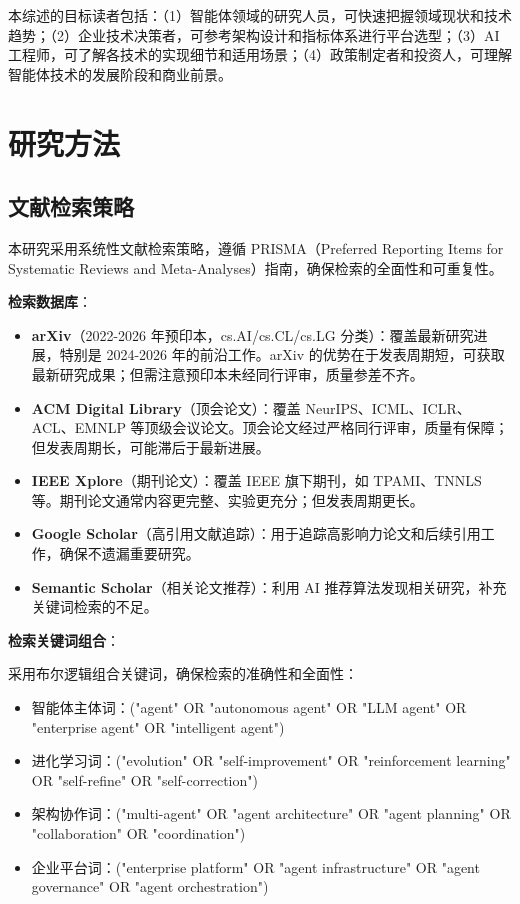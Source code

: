 \documentclass[12pt,a4paper]{article}
\begin{document}
本综述的目标读者包括：（1）智能体领域的研究人员，可快速把握领域现状和技术趋势；（2）企业技术决策者，可参考架构设计和指标体系进行平台选型；（3）AI 工程师，可了解各技术的实现细节和适用场景；（4）政策制定者和投资人，可理解智能体技术的发展阶段和商业前景。

\section{研究方法}
\label{sec:method}

\subsection{文献检索策略}

本研究采用系统性文献检索策略，遵循 PRISMA（Preferred Reporting Items for Systematic Reviews and Meta-Analyses）指南，确保检索的全面性和可重复性。

\textbf{检索数据库}：
\begin{itemize}
    \item \textbf{arXiv}（2022-2026 年预印本，cs.AI/cs.CL/cs.LG 分类）：覆盖最新研究进展，特别是 2024-2026 年的前沿工作。arXiv 的优势在于发表周期短，可获取最新研究成果；但需注意预印本未经同行评审，质量参差不齐。
    
    \item \textbf{ACM Digital Library}（顶会论文）：覆盖 NeurIPS、ICML、ICLR、ACL、EMNLP 等顶级会议论文。顶会论文经过严格同行评审，质量有保障；但发表周期长，可能滞后于最新进展。
    
    \item \textbf{IEEE Xplore}（期刊论文）：覆盖 IEEE 旗下期刊，如 TPAMI、TNNLS 等。期刊论文通常内容更完整、实验更充分；但发表周期更长。
    
    \item \textbf{Google Scholar}（高引用文献追踪）：用于追踪高影响力论文和后续引用工作，确保不遗漏重要研究。
    
    \item \textbf{Semantic Scholar}（相关论文推荐）：利用 AI 推荐算法发现相关研究，补充关键词检索的不足。
\end{itemize}

\textbf{检索关键词组合}：

采用布尔逻辑组合关键词，确保检索的准确性和全面性：
\begin{itemize}
    \item 智能体主体词：("agent" OR "autonomous agent" OR "LLM agent" OR "enterprise agent" OR "intelligent agent")
    \item 进化学习词：("evolution" OR "self-improvement" OR "reinforcement learning" OR "self-refine" OR "self-correction")
    \item 架构协作词：("multi-agent" OR "agent architecture" OR "agent planning" OR "collaboration" OR "coordination")
    \item 企业平台词：("enterprise platform" OR "agent infrastructure" OR "agent governance" OR "agent orchestration")
\end{itemize}
\end{document}
